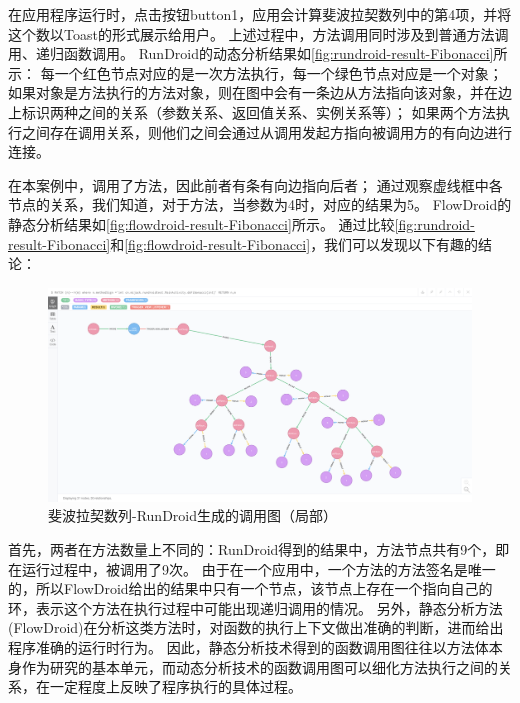 在应用程序运行时，点击按钮button1，应用会计算斐波拉契数列中的第4项，并将这个数以Toast的形式展示给用户。
上述过程中，方法调用同时涉及到普通方法调用、递归函数调用。
RunDroid的动态分析结果如\autoref{fig:rundroid-result-Fibonacci}所示：
每一个红色节点对应的是一次方法执行，每一个绿色节点对应是一个对象；
如果对象是方法执行的方法对象，则在图中会有一条边从方法指向该对象，并在边上标识两种之间的关系（参数关系、返回值关系、实例关系等）；
如果两个方法执行之间存在调用关系，则他们之间会通过从调用发起方指向被调用方的有向边进行连接。

在本案例中，调用了方法，因此前者有条有向边指向后者；
通过观察虚线框中各节点的关系，我们知道，对于方法，当参数为4时，对应的结果为5。
FlowDroid的静态分析结果如\autoref{fig:flowdroid-result-Fibonacci}所示。
通过比较\autoref{fig:rundroid-result-Fibonacci}和\autoref{fig:flowdroid-result-Fibonacci}，我们可以发现以下有趣的结论：


\begin{figure}[!ht]
	\centering
	\includegraphics[width=\textwidth]{./Figures/doFibonacci-rundroid.png}
	\caption{斐波拉契数列-RunDroid生成的调用图（局部）}
	\label{fig:rundroid-result-Fibonacci}
\end{figure}

首先，两者在方法数量上不同的：RunDroid得到的结果中，方法节点共有9个，即在运行过程中，被调用了9次。
由于在一个应用中，一个方法的方法签名是唯一的，所以FlowDroid给出的结果中只有一个节点，该节点上存在一个指向自己的环，表示这个方法在执行过程中可能出现递归调用的情况。
另外，静态分析方法(FlowDroid)在分析这类方法时，对函数的执行上下文做出准确的判断，进而给出程序准确的运行时行为。
因此，静态分析技术得到的函数调用图往往以方法体本身作为研究的基本单元，而动态分析技术的函数调用图可以细化方法执行之间的关系，在一定程度上反映了程序执行的具体过程。



